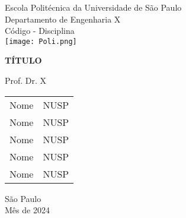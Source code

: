 \begin{titlepage}
    \begin{center}
        Escola Politécnica da Universidade de São Paulo\\
        Departamento de Engenharia X \\ Código - Disciplina\\

        \vspace{1.5cm}
        \texttt{[image: Poli.png]}
        
        \vspace*{1.5cm}
        \fontsize{18}{15}\textbf{TÍTULO}
        
        \vspace*{1.5cm}
        Prof. Dr. X

        \vspace*{1.5cm}
        \begin{tabular}{c c}
	        Nome & NUSP \\
            Nome & NUSP \\
            Nome & NUSP \\
            Nome & NUSP \\
            Nome & NUSP
        \end{tabular}
        
        \vspace*{\fill}
        {São Paulo\\
        Mês de 2024}
    \end{center}
\end{titlepage}